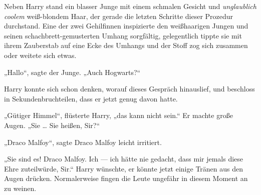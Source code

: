 Neben Harry stand ein blasser Junge mit einem schmalen Gesicht und \emph{unglaublich coolem} weiß-blondem Haar, der gerade die letzten Schritte dieser Prozedur durchstand. Eine der zwei Gehilfinnen inspizierte den weißhaarigen Jungen und seinen schachbrett-gemusterten Umhang sorgfältig, gelegentlich tippte sie mit ihrem Zauberstab auf eine Ecke des Umhangs und der Stoff zog sich zusammen oder weitete sich etwas.

„Hallo“, sagte der Junge.
„Auch Hogwarts?“

Harry konnte sich schon denken, worauf dieses Gespräch hinauslief, und beschloss in Sekundenbruchteilen, dass er jetzt genug davon hatte.

„Gütiger Himmel“, flüsterte Harry, „das kann nicht sein.“ Er machte große Augen.
„Sie … Sie heißen, Sir?“

„Draco Malfoy“, sagte Draco Malfoy leicht irritiert.

„Sie sind es! Draco Malfoy. Ich — ich hätte nie gedacht, dass mir jemals diese Ehre zuteilwürde, Sir.“ Harry wünschte, er könnte jetzt einige Tränen aus den Augen drücken. Normalerweise fingen die Leute ungefähr in diesem Moment an zu weinen.

